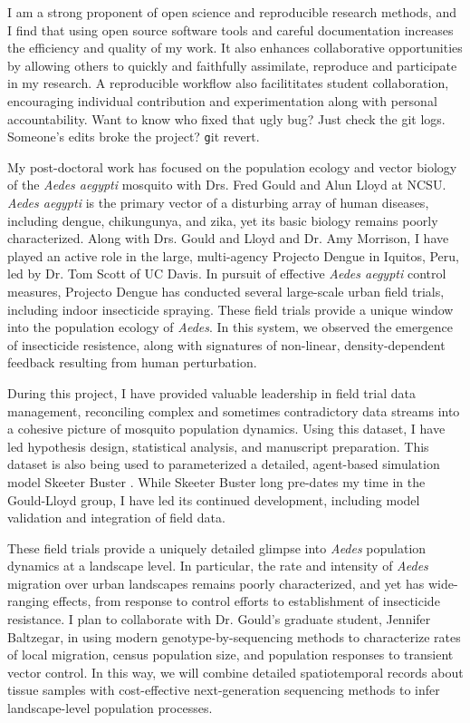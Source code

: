 \documentclass[12pt]{article}
\begin{document}
I am a strong proponent of open science and reproducible 
research methods, and I find that using open source software
tools and careful documentation increases the efficiency 
and quality of my work. It also enhances collaborative 
opportunities by allowing others to quickly and faithfully 
assimilate, reproduce and participate in my research. 
A reproducible workflow also facilititates student 
collaboration, encouraging individual contribution and 
experimentation along with personal accountability. 
Want to know who fixed that ugly bug? Just check the git logs. 
Someone's edits broke the project? {\texttt git revert}.

My post-doctoral work has focused on the population ecology and vector biology
of the {\em Aedes aegypti} mosquito with Drs. Fred Gould and Alun Lloyd at NCSU.
{\em Aedes aegypti} is the primary vector of a disturbing array of human
diseases, including dengue, chikungunya, and zika, yet its basic biology remains
poorly characterized. Along with Drs.  Gould and Lloyd and Dr. Amy Morrison, I
have played an active role in the large, multi-agency Projecto Dengue in
Iquitos, Peru, led by Dr. Tom Scott of UC Davis.  In pursuit of effective {\em
Aedes aegypti} control measures, Projecto Dengue has conducted several
large-scale urban field trials, including indoor insecticide spraying.  These
field trials provide a unique window into the population ecology of {\em Aedes}.
In this system, we observed the emergence of insecticide resistence, along with
signatures of  non-linear, density-dependent feedback resulting from human
perturbation.  

During this project, I have provided valuable leadership 
in field trial data management, reconciling complex and sometimes 
contradictory data streams into a cohesive picture of mosquito
population dynamics.  Using this dataset, I have led hypothesis design,
statistical analysis, and manuscript preparation.
This dataset is also being used to parameterized 
a detailed, agent-based simulation model Skeeter Buster
\citep{magori2009skeeter, okamoto2013reduce}. 
While Skeeter Buster long pre-dates my time in the Gould-Lloyd group,
I have led its continued development, including model validation and
integration of field data.  

These field trials provide a uniquely detailed glimpse 
into {\em Aedes} population dynamics at a landscape level. In particular, 
the rate and intensity of {\em Aedes} migration over urban landscapes 
remains poorly characterized, and yet has wide-ranging effects, from
response to control efforts to establishment of insecticide resistance. I
plan to collaborate with Dr. Gould's graduate student, Jennifer Baltzegar, in
using modern genotype-by-sequencing methods to characterize rates of local
migration, census population size, and population responses to transient 
vector control. In this way, we will combine detailed spatiotemporal 
records about tissue samples with cost-effective next-generation sequencing
methods to infer landscape-level population processes.
\end{document}
